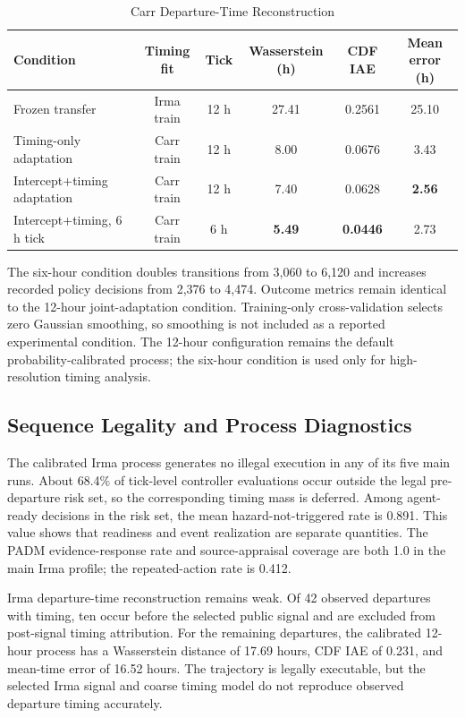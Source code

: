 \documentclass[journal]{IEEEtran}
\begin{document}
\begin{table}[!t]
\caption{Carr Departure-Time Reconstruction}
\label{tab:timing}
\centering
\small
\begin{tabular}{lccccc}
\toprule
Condition & Timing fit & Tick & Wasserstein (h) & CDF IAE & Mean error (h)\\
\midrule
Frozen transfer & Irma train & 12 h & 27.41 & 0.2561 & 25.10\\
Timing-only adaptation & Carr train & 12 h & 8.00 & 0.0676 & 3.43\\
Intercept+timing adaptation & Carr train & 12 h & 7.40 & 0.0628 & \textbf{2.56}\\
Intercept+timing, 6 h tick & Carr train & 6 h & \textbf{5.49} & \textbf{0.0446} & 2.73\\
\bottomrule
\end{tabular}
\end{table}

The six-hour condition doubles transitions from 3,060 to 6,120 and increases
recorded policy decisions from 2,376 to 4,474. Outcome metrics remain
identical to the 12-hour joint-adaptation condition. Training-only
cross-validation selects zero Gaussian smoothing, so smoothing is not included
as a reported experimental condition. The 12-hour configuration remains the
default probability-calibrated process; the six-hour condition is used only
for high-resolution timing analysis.

\subsection{Sequence Legality and Process Diagnostics}
The calibrated Irma process generates no illegal execution in any of its five
main runs. About
68.4\% of tick-level controller evaluations occur outside the legal
pre-departure risk set, so the corresponding timing mass is deferred. Among
agent-ready decisions in the risk set, the mean hazard-not-triggered rate is
0.891. This value shows that readiness and event realization are separate
quantities. The PADM evidence-response rate and source-appraisal coverage are
both 1.0 in the main Irma profile; the repeated-action rate is 0.412.

Irma departure-time reconstruction remains weak. Of 42 observed departures
with timing, ten occur before the selected public signal and are excluded from
post-signal timing attribution. For the remaining departures, the calibrated
12-hour process has a Wasserstein distance of 17.69 hours, CDF IAE of 0.231,
and mean-time error of 16.52 hours. The trajectory is legally executable, but
the selected Irma signal and coarse timing model do not reproduce observed
departure timing accurately.
\end{document}
